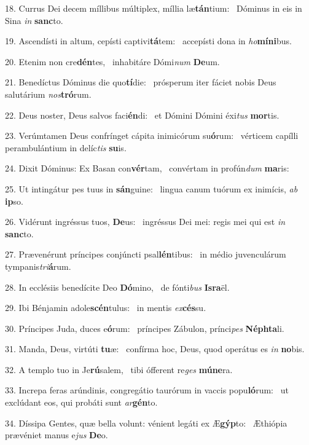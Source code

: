 18. Currus Dei decem míllibus múltiplex, míllia læ\textbf{tán}tium: \ast\  Dóminus in eis in Sina \textit{in} \textbf{sanc}to.\

19. Ascendísti in altum, cepísti captivi\textbf{tá}tem: \ast\  accepísti dona in \textit{ho}\textbf{mí}\textbf{ni}bus.\

20. Etenim non cre\textbf{dén}tes, \ast\  inhabitáre Dómi\textit{num} \textbf{De}um.\

21. Benedíctus Dóminus die quo\textbf{tí}die: \ast\  prósperum iter fáciet nobis Deus salutárium \textit{nos}\textbf{tró}rum.\

22. Deus noster, Deus salvos faci\textbf{én}di: \ast\  et Dómini Dómini éxi\textit{tus} \textbf{mor}tis.\

23. Verúmtamen Deus confrínget cápita inimicórum su\textbf{ó}rum: \ast\  vérticem capílli perambulántium in delíc\textit{tis} \textbf{su}is.\

24. Dixit Dóminus: Ex Basan con\textbf{vér}tam, \ast\  convértam in profún\textit{dum} \textbf{ma}ris:\

25. Ut intingátur pes tuus in \textbf{sán}guine: \ast\  lingua canum tuórum ex inimícis, \textit{ab} \textbf{ip}so.\

26. Vidérunt ingréssus tuos, \textbf{De}us: \ast\  ingréssus Dei mei: regis mei qui est \textit{in} \textbf{sanc}to.\

27. Prævenérunt príncipes conjúncti psal\textbf{lén}tibus: \ast\  in médio juvenculárum tympanis\textit{tri}\textbf{á}rum.\

28. In ecclésiis benedícite Deo \textbf{Dó}mino, \ast\  de fónti\textit{bus} \textbf{Is}\textbf{ra}ël.\

29. Ibi Bénjamin adole\textbf{scén}tulus: \ast\  in mentis \textit{ex}\textbf{cés}su.\

30. Príncipes Juda, duces e\textbf{ó}rum: \ast\  príncipes Zábulon, prínci\textit{pes} \textbf{Néph}\textbf{ta}li.\

31. Manda, Deus, virtúti \textbf{tu}æ: \ast\  confírma hoc, Deus, quod operátus es \textit{in} \textbf{no}bis.\

32. A templo tuo in Je\textbf{rú}salem, \ast\  tibi ófferent re\textit{ges} \textbf{mú}\textbf{ne}ra.\

33. Increpa feras arúndinis, congregátio taurórum in vaccis popu\textbf{ló}rum: \ast\  ut exclúdant eos, qui probáti sunt \textit{ar}\textbf{gén}to.\

34. Díssipa Gentes, quæ bella volunt: vénient legáti ex Æ\textbf{gýp}to: \ast\  Æthiópia prævéniet manus e\textit{jus} \textbf{De}o.\

